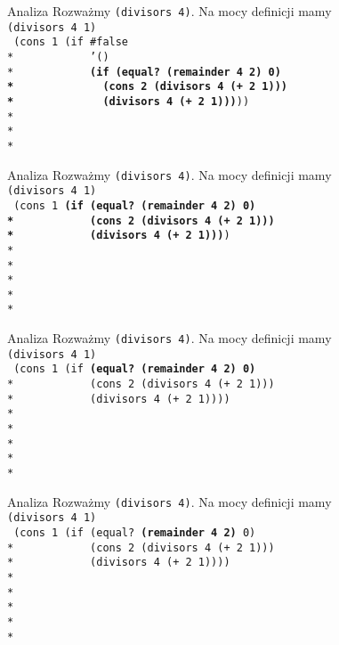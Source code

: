 \begin{frame}{Analiza}
  Rozważmy \texttt{(divisors 4)}. Na mocy definicji mamy\\
  \texttt{(divisors 4 1)}\\
  \texttt{
(cons 1 (if \#false\\*
\ \ \ \ \ \ \ \ \ \ \ '()\\*
\ \ \ \ \ \ \ \ \ \ \ \textbf{(if (equal?\ (remainder 4 2) 0)\\*
\ \ \ \ \ \ \ \ \ \ \ \ \ (cons 2 (divisors 4 (+ 2 1)))\\*
\ \ \ \ \ \ \ \ \ \ \ \ \ (divisors 4 (+ 2 1)))}))
\ \\*
\ \\*
\ \\*
  }
\end{frame}

\begin{frame}{Analiza}
  Rozważmy \texttt{(divisors 4)}. Na mocy definicji mamy\\
  \texttt{(divisors 4 1)}\\
  \texttt{
(cons 1 \textbf{(if (equal?\ (remainder 4 2) 0)\\*
\ \ \ \ \ \ \ \ \ \ \ (cons 2 (divisors 4 (+ 2 1)))\\*
\ \ \ \ \ \ \ \ \ \ \ (divisors 4 (+ 2 1)))})\\*
    \ \\*
    \ \\*
    \ \\*
    \ \\*
  }
\end{frame}

\begin{frame}{Analiza}
  Rozważmy \texttt{(divisors 4)}. Na mocy definicji mamy\\
  \texttt{(divisors 4 1)}\\
  \texttt{
(cons 1 (if \textbf{(equal?\ (remainder 4 2) 0)}\\*
\ \ \ \ \ \ \ \ \ \ \ (cons 2 (divisors 4 (+ 2 1)))\\*
\ \ \ \ \ \ \ \ \ \ \ (divisors 4 (+ 2 1))))\\*
    \ \\*
    \ \\*
    \ \\*
    \ \\*
  }
\end{frame}

\begin{frame}{Analiza}
  Rozważmy \texttt{(divisors 4)}. Na mocy definicji mamy\\
  \texttt{(divisors 4 1)}\\
  \texttt{
(cons 1 (if (equal?\ \textbf{(remainder 4 2)} 0)\\*
\ \ \ \ \ \ \ \ \ \ \ (cons 2 (divisors 4 (+ 2 1)))\\*
\ \ \ \ \ \ \ \ \ \ \ (divisors 4 (+ 2 1))))\\*
    \ \\*
    \ \\*
    \ \\*
    \ \\*
  }
\end{frame}

